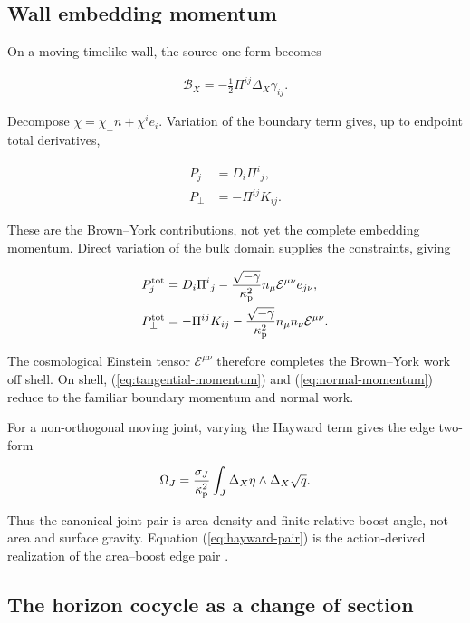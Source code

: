 \subsection{Wall embedding momentum}\label{subsec:embedding-momentum}

On a moving timelike wall, the source one-form becomes

\begin{align}
\mathcal B_X=-\frac12\Pi^{ij}\Delta_X\gamma_{ij}.
\end{align}

Decompose $\chi=\chi_\perp n+\chi^ie_i$. Variation of the boundary term gives, up to endpoint total derivatives,

\begin{align}
P_j&=D_i\Pi^i{}_j,\\
P_\perp&=-\Pi^{ij}K_{ij}.
\end{align}

These are the Brown--York contributions, not yet the complete embedding momentum. Direct variation of the bulk domain supplies the constraints, giving

\begin{align}
P_j^{\rm tot}
&=D_i\Pi^i{}_j
-\frac{\sqrt{-\gamma}}{\kappa_{\rm p}^{2}}
n_\mu\mathcal E^{\mu\nu}e_{j\nu}, \label{eq:tangential-momentum}\\
P_\perp^{\rm tot}
&=-\Pi^{ij}K_{ij}
-\frac{\sqrt{-\gamma}}{\kappa_{\rm p}^{2}}
n_\mu n_\nu\mathcal E^{\mu\nu}. \label{eq:normal-momentum}
\end{align}

The cosmological Einstein tensor $\mathcal E^{\mu\nu}$ therefore completes the Brown--York work off shell. On shell, (\ref{eq:tangential-momentum}) and (\ref{eq:normal-momentum}) reduce to the familiar boundary momentum and normal work.

For a non-orthogonal moving joint, varying the Hayward term gives the edge two-form

\begin{align}
\Omega_J
=\frac{\sigma_J}{\kappa_{\rm p}^{2}}
\int_J\Delta_X\eta\wedge\Delta_X\sqrt q . \label{eq:hayward-pair}
\end{align}

Thus the canonical joint pair is area density and finite relative boost angle, not area and surface gravity. Equation (\ref{eq:hayward-pair}) is the action-derived realization of the area--boost edge pair \cite{Takayanagi:2019tvn}.

\subsection{The horizon cocycle as a change of section}\label{subsec:section-change}

